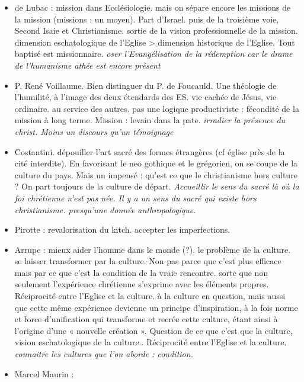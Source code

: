 \begin{itemize}
\item de Lubac : mission dans Ecclésiologie. mais on sépare encore les missions de la mission (missions : un moyen). Part d'Israel. puis de la troisième voie, Second Isaie et Christianisme. sortie de la vision professionnelle de la mission. dimension eschatologique de l'Eglise > dimension historique de l'Eglise. Tout baptisé est missionnaire.  \textit{oser l'Evangélisation de la rédemption car le drame de l'humanisme athée est encore présent}

\item P. René Voillaume. Bien distinguer du P. de Foucauld. Une théologie de l'humilité, à l'image des deux étendards des ES. vie cachée de Jésus, vie ordinaire. au service des autres. pas une logique productiviste : fécondité de la mission à long terme. Mission : levain dans la pate. \textit{irradier la présence du christ. Moins un discours qu'un témoignage}

\item Costantini. dépouiller l'art sacré des formes étrangères (cf église près de la cité interdite). En favorisant le neo gothique et le grégorien, on se coupe de la culture du pays. Mais un impensé : qu'est ce que le christianisme hors culture ? On part toujours de la culture de départ. \textit{Accueillir le sens du sacré là où la foi chrétienne n'est pas née. Il y a un sens du sacré qui existe hors christianisme. presqu'une donnée anthropologique.}

\item Pirotte : revalorisation du kitch.  accepter les imperfections.

\item Arrupe : mieux aider l'homme dans le monde (?). le problème de la culture. se laisser transformer par la culture. Non pas parce que c'est plus efficace mais par ce que c'est la condition de la vraie rencontre. sorte que non seulement l’expérience chrétienne s’exprime avec les éléments propres. Réciprocité entre l'Eglise et la culture. 
à la culture en question, mais aussi que cette même expérience devienne un principe d’inspiration, à la fois norme et force d’unification qui transforme et recrée cette culture, étant ainsi à l’origine d’une « nouvelle création ». Question de ce que c'est que la culture, vision eschatologique de la culture.. Réciprocité entre l'Eglise et la culture. \textit{connaitre les cultures que l'on aborde : condition. }

\item Marcel Maurin : 


\end{itemize}
